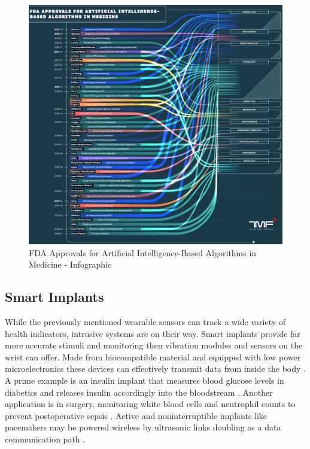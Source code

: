 \begin{figure}[htp]
    \centering
    \includegraphics[width=\textwidth]{media/The-Medical-Futurist-FDA-approved-AI-algorithms-in-medicine-2019-09.png}
    \caption{FDA Approvals for Artificial Intelligence-Based Algorithms in Medicine - Infographic \cite{fdaAi}}%
    \label{fig:FDA_AI_Info}
\end{figure}
\subsection{Smart Implants}
While the previously mentioned wearable sensors can track a wide variety of health indicators, intrusive systems are on their way. Smart implants provide far more accurate stimuli and monitoring then vibration modules and sensors on the wrist can offer. Made from biocompatible material and equipped with low power microelectronics these devices can effectively transmit data from inside the body \cite{andreu2015wearable}. A prime example is an insulin implant that measures blood glucose levels in diabetics and releases insulin accordingly into the bloodstream \cite{rege2017development}. Another application is in surgery, monitoring white blood cells and neutrophil counts to prevent postoperative sepsis \cite{venema2013robustness}. Active and noninterruptible implants like pacemakers may be powered wireless by ultrasonic links doubling as a data communication path \cite{ozeri2010ultrasonic}.
